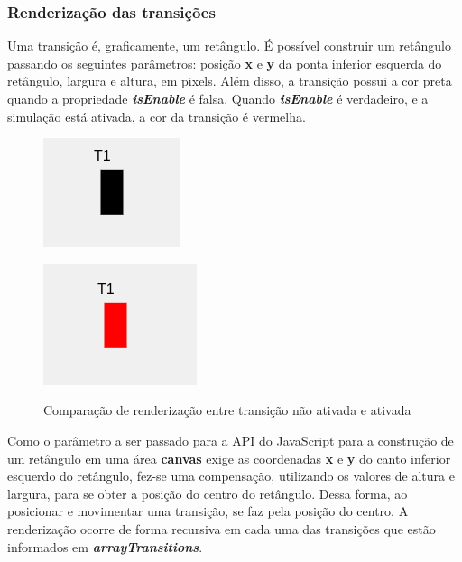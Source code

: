 \documentclass[
	12pt,				%
	openright,			%
	oneside,			%
	a4paper,			%
	english,			%
	brazil				%
	]{abntex2}
\begin{document}
\subsubsection*{Renderização das transições}

Uma transição é, graficamente, um retângulo. É possível construir um retângulo passando os seguintes parâmetros: posição \textbf{x} e \textbf{y} da ponta inferior esquerda do retângulo, largura e altura, em pixels. Além disso, a transição possui a cor preta quando a propriedade \textbf{\textit{isEnable}} é falsa. Quando \textbf{\textit{isEnable}} é verdadeiro, e a simulação está ativada, a cor da transição é vermelha. 



\begin{figure}[ht]
	\centering
	\begin{minipage}{0.49\textwidth}
		\centering
		\includegraphics[scale=1]{figuras/renderTransitionEnableFalse.png}
		\label{fig:renderTransitionEnableFalse}
	\end{minipage}
	\hfill
	\begin{minipage}{0.49\textwidth}
		\centering
		\includegraphics[scale=1]{figuras/renderTransitionEnableTrue.png}
		\label{fig:renderTransitionEnableTrue}
	\end{minipage}
	\caption{Comparação de renderização entre transição não ativada e ativada}
\end{figure}

Como o parâmetro a ser passado para a API do JavaScript para a construção de um retângulo em uma área \textbf{canvas} exige as coordenadas \textbf{x} e \textbf{y} do canto inferior esquerdo do retângulo, fez-se uma compensação, utilizando os valores de altura e largura, para se obter a posição do centro do retângulo. Dessa forma, ao posicionar e movimentar uma transição, se faz pela posição do centro.  A renderização ocorre de forma recursiva em cada uma das transições que estão informados em \textbf{\textit{arrayTransitions}}.
\end{document}
